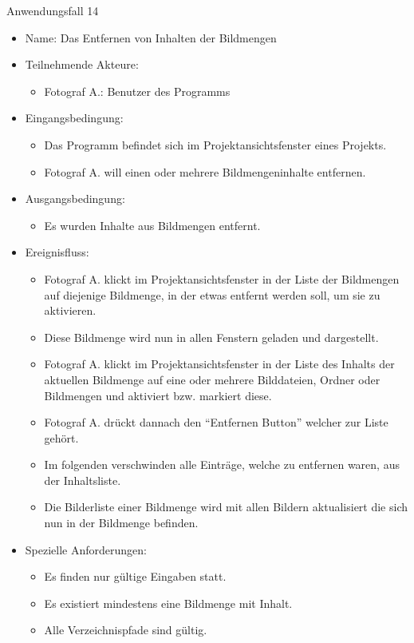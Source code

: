 	\begin{description}
		\item[Anwendungsfall 14]
	\end{description}
	
	\begin{itemize}
		\item Name: Das Entfernen von Inhalten der Bildmengen
		\item Teilnehmende Akteure:
		\begin{itemize}
			\item	Fotograf A.: Benutzer des Programms		
		\end{itemize}
		\item Eingangsbedingung:
		\begin{itemize}
			\item	Das Programm befindet sich im Projektansichtsfenster eines Projekts.
			\item Fotograf A. will einen oder mehrere Bildmengeninhalte entfernen.
		\end{itemize}
		\item Ausgangsbedingung:
		\begin{itemize}
			\item	Es wurden Inhalte aus Bildmengen entfernt.	
		\end{itemize}
		\item Ereignisfluss:
		\begin{itemize}
			\item Fotograf A. klickt im Projektansichtsfenster in der Liste der Bildmengen auf diejenige Bildmenge, in der etwas entfernt werden soll, um sie zu aktivieren.		
			\item Diese Bildmenge wird nun in allen Fenstern geladen und dargestellt.
			\item Fotograf A. klickt im Projektansichtsfenster in der Liste des Inhalts der aktuellen Bildmenge auf eine oder mehrere Bilddateien, Ordner oder Bildmengen und aktiviert bzw. markiert diese.
			\item Fotograf A. drückt dannach den "`Entfernen Button"' welcher zur Liste gehört.
			\item Im folgenden verschwinden alle Einträge, welche zu entfernen waren, aus der Inhaltsliste.
			\item Die Bilderliste einer Bildmenge wird mit allen Bildern aktualisiert die sich nun in der Bildmenge befinden.
		\end{itemize}
		\item Spezielle Anforderungen:
		\begin{itemize}
			\item	Es finden nur gültige Eingaben statt.
			\item Es existiert mindestens eine Bildmenge mit Inhalt.
			\item Alle Verzeichnispfade sind gültig.
		\end{itemize}			
	\end{itemize}
	
